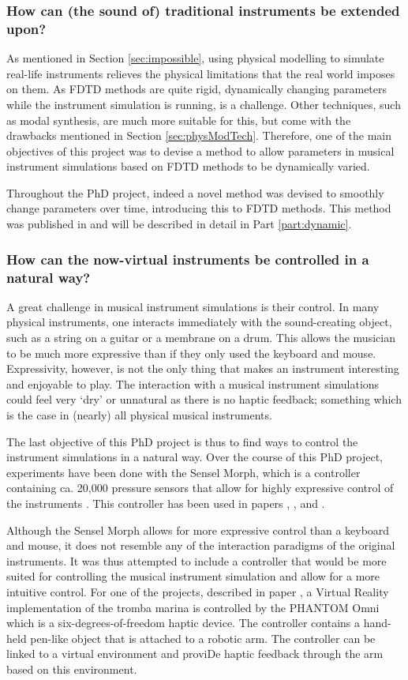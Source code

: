 \subsubsection{How can (the sound of) traditional instruments be extended upon?}
As mentioned in Section \ref{sec:impossible}, using physical modelling to simulate real-life instruments relieves the physical limitations that the real world imposes on them.
As FDTD methods are quite rigid, dynamically changing parameters while the instrument simulation is running, is a challenge. Other techniques, such as modal synthesis, are much more suitable for this, but come with the drawbacks mentioned in Section \ref{sec:physModTech}. Therefore, one of the main objectives of this project was to devise a method to allow parameters in musical instrument simulations based on FDTD methods to be dynamically varied.

Throughout the PhD project, indeed a novel method was devised to smoothly change parameters over time, introducing this to FDTD methods. This method was published in \citeP[G] and will be described in detail in Part \ref{part:dynamic}.

\subsubsection{How can the now-virtual instruments be controlled in a natural way?}

A great challenge in musical instrument simulations is their control. In many physical instruments, one interacts immediately with the sound-creating object, such as a string on a guitar or a membrane on a drum. This allows the musician to be much more expressive than if they only used the keyboard and mouse. 
Expressivity, however, is not the only thing that makes an instrument interesting and enjoyable to play. The interaction with a musical instrument simulations could feel very `dry' or unnatural as there is no haptic feedback; something which is the case in (nearly) all physical musical instruments. 

The last objective of this PhD project is thus to find ways to control the instrument simulations in a natural way. 
Over the course of this PhD project, experiments have been done with the Sensel Morph, which is a controller containing ca. 20,000 pressure sensors that allow for highly expressive control of the instruments \cite{sensel}. This controller has been used in papers \citeP[A], \citeP[B], \citeP[C] and \citeP[D].

Although the Sensel Morph allows for more expressive control than a keyboard and mouse, it does not resemble any of the interaction paradigms of the original instruments. It was thus attempted to include a controller that would be more suited for controlling the musical instrument simulation and allow for a more intuitive control.
For one of the projects, described in paper \citeP[E], a Virtual Reality implementation of the tromba marina is controlled by the PHANTOM Omni \cite{phantom} which is a six-degrees-of-freedom haptic device. The controller contains a hand-held pen-like object that is attached to a robotic arm. The controller can be linked to a virtual environment and proviDe haptic feedback through the arm based on this environment. 

